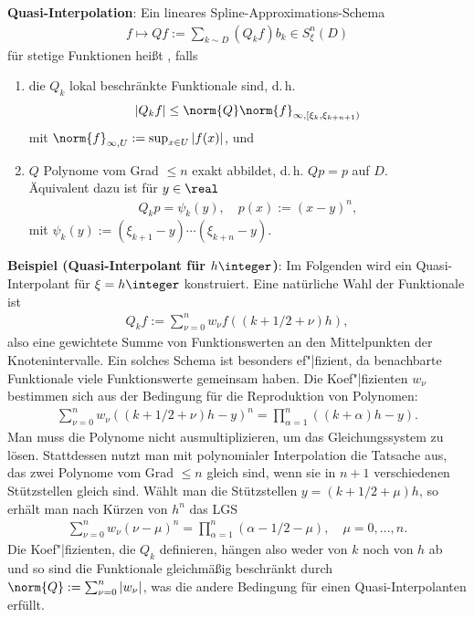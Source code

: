 \textbf{Quasi-Interpolation}:
Ein lineares Spline-Approximations-Schema
\begin{align*}
    f \mapsto Qf := \sum_{k \sim D} (Q_k f) b_k \in S_\xi^n(D)
\end{align*}
für stetige Funktionen heißt , falls
\begin{enumerate}
    \item
    die $Q_k$ lokal beschränkte Funktionale sind, d.\,h.
    \begin{align*}
        |Q_k f| \le \norm{Q} \norm{f}_{\infty, [\xi_k, \xi_{k+n+1})}
    \end{align*}
    mit $\norm{f}_{\infty, U} := \sup_{x \in U} |f(x)|$, und

    \item
    $Q$ Polynome vom Grad $\le n$ exakt abbildet, d.\,h. $Qp = p$ auf $D$.\\
    Äquivalent dazu ist für $y \in \real$
    \begin{align*}
        Q_k p = \psi_k(y),\quad
        p(x) := (x - y)^n,
    \end{align*}
    mit $\psi_k(y) := (\xi_{k+1} - y) \dotsm (\xi_{k+n} - y)$.
\end{enumerate}

\linie
\pagebreak

\textbf{Beispiel (Quasi-Interpolant für $h\integer$)}:
Im Folgenden wird ein Quasi-Interpolant für $\xi = h\integer$ konstruiert.
Eine natürliche Wahl der Funktionale ist
\begin{align*}
    Q_k f := \sum_{\nu=0}^n w_\nu f((k + 1/2 + \nu)h),
\end{align*}
also eine gewichtete Summe von Funktionswerten an den Mittelpunkten der Knotenintervalle.
Ein solches Schema ist besonders ef"|fizient, da benachbarte Funktionale viele Funktionswerte
gemeinsam haben.
Die Koef"|fizienten $w_\nu$ bestimmen sich aus der Bedingung für die Reproduktion von Polynomen:
\begin{align*}
    \sum_{\nu=0}^n w_\nu ((k + 1/2 + \nu)h - y)^n = \prod_{\alpha=1}^n ((k + \alpha)h - y).
\end{align*}
Man muss die Polynome nicht ausmultiplizieren, um das Gleichungssystem zu lösen.
Stattdessen nutzt man mit polynomialer Interpolation die Tatsache aus, das zwei Polynome vom
Grad $\le n$ gleich sind, wenn sie in $n + 1$ verschiedenen Stützstellen gleich sind.
Wählt man die Stützstellen $y = (k + 1/2 + \mu)h$, so erhält man nach Kürzen von $h^n$ das LGS
\begin{align*}
    \sum_{\nu=0}^n w_\nu (\nu - \mu)^n = \prod_{\alpha=1}^n (\alpha - 1/2 - \mu),\quad
    \mu = 0, \dotsc, n.
\end{align*}
Die Koef"|fizienten, die $Q_k$ definieren, hängen also weder von $k$ noch von $h$ ab und
so sind die Funktionale gleichmäßig beschränkt durch $\norm{Q} := \sum_{\nu=0}^n |w_\nu|$,
was die andere Bedingung für einen Quasi-Interpolanten erfüllt.

